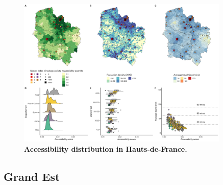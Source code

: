 \begin{figure}[H]
    \includegraphics[width=0.9\textwidth]{images/camion/region_accessibility/accessibility_Hauts-de-France.png}
    \centering
    \caption{
        \textbf{Accessibility distribution in Hauts-de-France.}
    }
\end{figure}

\subsection*{Grand Est}

